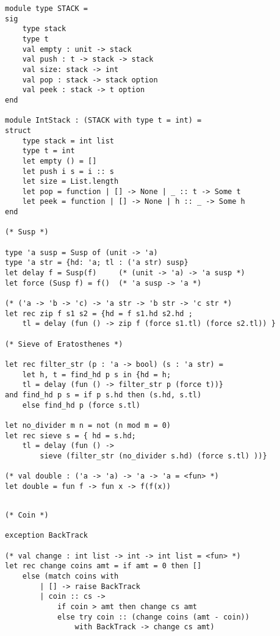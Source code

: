 \documentclass[12pt]{article}
\begin{document}
\pagebreak

\begin{multicols}{2}

\begin{lstlisting}
module type STACK =
sig
    type stack
    type t
    val empty : unit -> stack
    val push : t -> stack -> stack
    val size: stack -> int
    val pop : stack -> stack option
    val peek : stack -> t option
end

module IntStack : (STACK with type t = int) =
struct
    type stack = int list
    type t = int
    let empty () = []
    let push i s = i :: s
    let size = List.length
    let pop = function | [] -> None | _ :: t -> Some t
    let peek = function | [] -> None | h :: _ -> Some h
end

(* Susp *)

type 'a susp = Susp of (unit -> 'a)
type 'a str = {hd: 'a; tl : ('a str) susp}
let delay f = Susp(f)     (* (unit -> 'a) -> 'a susp *)
let force (Susp f) = f()  (* 'a susp -> 'a *)

(* ('a -> 'b -> 'c) -> 'a str -> 'b str -> 'c str *)
let rec zip f s1 s2 = {hd = f s1.hd s2.hd ; 
    tl = delay (fun () -> zip f (force s1.tl) (force s2.tl)) }

(* Sieve of Eratosthenes *)

let rec filter_str (p : 'a -> bool) (s : 'a str) =
    let h, t = find_hd p s in {hd = h; 
    tl = delay (fun () -> filter_str p (force t))}
and find_hd p s = if p s.hd then (s.hd, s.tl)
    else find_hd p (force s.tl)

let no_divider m n = not (n mod m = 0)    
let rec sieve s = { hd = s.hd; 
    tl = delay (fun () -> 
        sieve (filter_str (no_divider s.hd) (force s.tl) ))}

(* val double : ('a -> 'a) -> 'a -> 'a = <fun> *)
let double = fun f -> fun x -> f(f(x))


\end{lstlisting}

\columnbreak

\begin{lstlisting}
(* Coin *)

exception BackTrack

(* val change : int list -> int -> int list = <fun> *)
let rec change coins amt = if amt = 0 then []
    else (match coins with 
        | [] -> raise BackTrack
        | coin :: cs ->
            if coin > amt then change cs amt
            else try coin :: (change coins (amt - coin)) 
                with BackTrack -> change cs amt)


\end{lstlisting}
\end{multicols}
\end{document}
